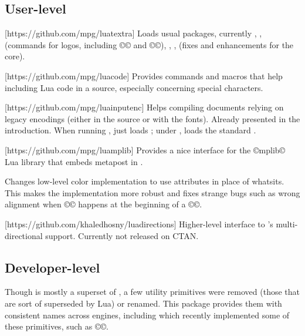 \documentclass{lltxdoc}
\begin{document}
\subsection{User-level}

[https://github.com/mpg/luatextra]
Loads usual packages, currently , , 
(commands for logos, including ©\LuaTeX© and ©\LuaLaTeX©), ,
,  (fixes and enhancements for the \latex core).

[https://github.com/mpg/luacode]
Provides commands and macros that help including Lua code in a \tex source,
especially concerning special characters.

[https://github.com/mpg/luainputenc]
Helps compiling documents relying on legacy encodings (either in the source or
with the fonts). Already presented in the introduction. When running \xetex,
just loads ; under \pdftex, loads the standard
.

[https://github.com/mpg/luamplib]
Provides a nice interface for the ©mplib© Lua library that embeds metapost in
\luatex.

Changes low-level color implementation to use \luatex attributes in place of
whatsits. This makes the implementation more robust and fixes strange bugs
such as wrong alignment when ©\color© happens at the beginning of a ©\vbox©.

[https://github.com/khaledhosny/luadirections]
Higher-level interface to \luatex's multi-directional support. Currently not
released on CTAN.

\subsection{Developer-level}

Though \luatex is mostly a superset of \pdftex, a few utility primitives were
removed (those that are sort of superseded by Lua) or renamed. This package
provides them with consistent names across engines, including \xetex which
recently implemented some of these primitives, such as ©\strcmp©.
\end{document}
